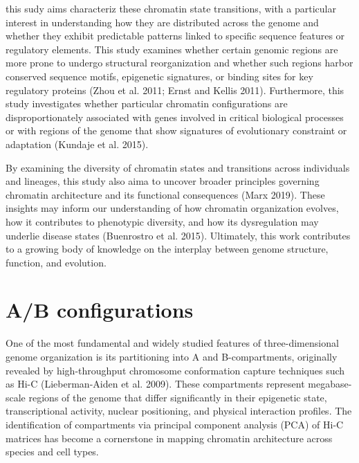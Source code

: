 \documentclass[
  a4paper,
  openany]{scrbook}
\begin{document}
this sudy aims characteriz these chromatin state transitions, with a
particular interest in understanding how they are distributed across the
genome and whether they exhibit predictable patterns linked to specific
sequence features or regulatory elements. This study examines whether
certain genomic regions are more prone to undergo structural
reorganization and whether such regions harbor conserved sequence
motifs, epigenetic signatures, or binding sites for key regulatory
proteins (Zhou et al. 2011; Ernst and Kellis 2011). Furthermore, this
study investigates whether particular chromatin configurations are
disproportionately associated with genes involved in critical biological
processes or with regions of the genome that show signatures of
evolutionary constraint or adaptation (Kundaje et al. 2015).

By examining the diversity of chromatin states and transitions across
individuals and lineages, this study also aima to uncover broader
principles governing chromatin architecture and its functional
consequences (Marx 2019). These insights may inform our understanding of
how chromatin organization evolves, how it contributes to phenotypic
diversity, and how its dysregulation may underlie disease states
(Buenrostro et al. 2015). Ultimately, this work contributes to a growing
body of knowledge on the interplay between genome structure, function,
and evolution.

\section{A/B configurations}\label{ab-configurations}

One of the most fundamental and widely studied features of
three-dimensional genome organization is its partitioning into A and
B-compartments, originally revealed by high-throughput chromosome
conformation capture techniques such as Hi-C (Lieberman-Aiden et al.
2009). These compartments represent megabase-scale regions of the genome
that differ significantly in their epigenetic state, transcriptional
activity, nuclear positioning, and physical interaction profiles. The
identification of compartments via principal component analysis (PCA) of
Hi-C matrices has become a cornerstone in mapping chromatin architecture
across species and cell types.
\end{document}
